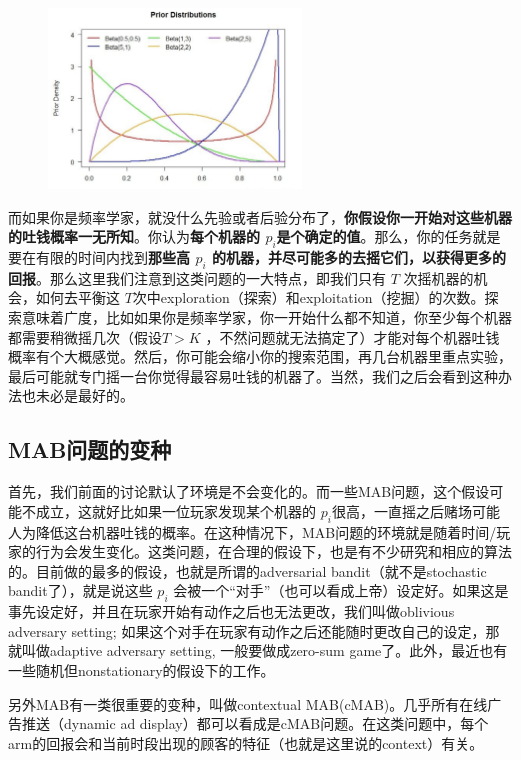 \documentclass[12pt]{article}
\begin{document}
\begin{figure}[H]
    \centering
    \includegraphics[width=0.6\textwidth]{fig/Bandit-BETA-Examples.png}
\end{figure}

而如果你是频率学家，就没什么先验或者后验分布了，\textbf{你假设你一开始对这些机器的吐钱概率一无所知}。你认为\textbf{每个机器的 $p_i$是个确定的值}。那么，你的任务就是要在有限的时间内找到\textbf{那些高 $p_i$ 的机器，并尽可能多的去摇它们，以获得更多的回报}。那么这里我们注意到这类问题的一大特点，即我们只有 $T$ 次摇机器的机会，如何去平衡这 $T$次中exploration（探索）和exploitation（挖掘）的次数。探索意味着广度，比如如果你是频率学家，你一开始什么都不知道，你至少每个机器都需要稍微摇几次（假设$T > K$ ，不然问题就无法搞定了）才能对每个机器吐钱概率有个大概感觉。然后，你可能会缩小你的搜索范围，再几台机器里重点实验，最后可能就专门摇一台你觉得最容易吐钱的机器了。当然，我们之后会看到这种办法也未必是最好的。

\subsection{MAB问题的变种}
首先，我们前面的讨论默认了环境是不会变化的。而一些MAB问题，这个假设可能不成立，这就好比如果一位玩家发现某个机器的 $p_i$很高，一直摇之后赌场可能人为降低这台机器吐钱的概率。在这种情况下，MAB问题的环境就是随着时间/玩家的行为会发生变化。这类问题，在合理的假设下，也是有不少研究和相应的算法的。目前做的最多的假设，也就是所谓的adversarial bandit（就不是stochastic bandit了），就是说这些 $p_i$ 会被一个“对手”（也可以看成上帝）设定好。如果这是事先设定好，并且在玩家开始有动作之后也无法更改，我们叫做oblivious adversary setting; 如果这个对手在玩家有动作之后还能随时更改自己的设定，那就叫做adaptive adversary setting, 一般要做成zero-sum game了。此外，最近也有一些随机但nonstationary的假设下的工作。

另外MAB有一类很重要的变种，叫做contextual MAB(cMAB)。几乎所有在线广告推送（dynamic ad display）都可以看成是cMAB问题。在这类问题中，每个arm的回报会和当前时段出现的顾客的特征（也就是这里说的context）有关。
\end{document}

